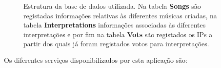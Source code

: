 \documentclass[a4paper,11pt,openright,oneside]{report}
\begin{document}
\begin{figure}[ht]	
\center
{}
\caption{Estrutura da base de dados utilizada. Na tabela \textbf{Songs} são registadas informações relativas às diferentes músicas criadas, na tabela \textbf{Interpretations} informações associadas às diferentes interpretações e por fim na tabela \textbf{Vots} são registados os IPs a partir dos quais já foram registados votos para interpretações.}
\label{fig:sr1}
\end{figure}

Os diferentes serviços disponibilizados por esta aplicação são:
\end{document}
